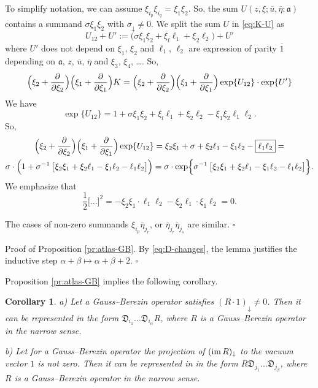 \documentclass[]{amsart}
\newtheorem{corollary}[theorem]{Corollary}
\newcommand{\im}{\mathop{\rm im}\nolimits}
\def\frD{\mathfrak D}
\def\fra{\mathfrak a}
\def\ov{\overline}
\def\sm{\smallskip}
\def\1{{\ov 1}}
\begin{document}
To simplify notation, we can assume $\xi_{i_p}\xi_{i_q}=\xi_1\xi_2$.
So, the sum $U(z,\xi;\ov u, \ov \eta;\fra)$
contains a summand $\sigma \xi_1\xi_2$ with $\sigma_\downarrow\ne 0$.
We split the sum $U$ in \eqref{eq:K-U} as
$$U_{12}+U':=
\bigl( \sigma \xi_1\xi_2+ \xi_l \ell_1 +\xi_2\ell_2\bigr) + U' 
$$
where $U'$ does not depend on $\xi_1$, $\xi_2$ and
$\ell_{1}$, $\ell_{2}$ are expression of parity $\1$ depending
on $\fra$, $z$, $\ov u$, $\ov \eta$ and $\xi_3$, $\xi_4$, \dots.
So,
$$
\Bigl(\xi_2+\frac\partial{\partial \xi_2}\Bigr)
\Bigl(\xi_1+\frac\partial{\partial \xi_1}\Bigr)
K=
\Bigl(\xi_2+\frac\partial{\partial \xi_2}\Bigr)
\Bigl(\xi_1+\frac\partial{\partial \xi_1}\Bigr)\exp\{U_{12}\}
\cdot \exp\{U'\}
$$
We have
$$
\exp\{U_{12}\}=1+\sigma \xi_1\xi_2+ \xi_l \ell_1 +\xi_2\ell_2-\boxed{\xi_1\xi_2\ell_1\ell_2}.
$$
So, 
\begin{multline*}
\Bigl(\xi_2+\frac\partial{\partial \xi_2}\Bigr)
\Bigl(\xi_1+\frac\partial{\partial \xi_1}\Bigr)
\exp\{U_{12}\}=\xi_2\xi_1+\sigma +\xi_2\ell_1-\xi_1\ell_2-\boxed{\ell_1\ell_2}
=\\\sigma\cdot\Bigl(1+\sigma^{-1}\,
\bigl[\xi_2\xi_1+\xi_2\ell_1-\xi_1\ell_2-\ell_1\ell_2 \bigr]\Bigr)=
\sigma\cdot\exp\Bigl\{ \sigma^{-1}\,
\bigl[\xi_2\xi_1+\xi_2\ell_1-\xi_1\ell_2-\ell_1\ell_2 \bigr]\Bigr\}.
\end{multline*}
We emphasize that 
$$
\frac12\bigl[\dots\bigr]^2=
-\xi_2\xi_1\cdot \ell_1\ell_2-\xi_2\ell_1\cdot \xi_1\ell_2=0. 
$$ 

The cases of non-zero summands $\xi_{i_p}\ov\eta_{j_r}$,
or $\ov\eta_{j_r}\ov\eta_{j_s}$
 are similar.
\hfill $\square$

\sm 

{\sc Proof of Proposition \ref{pr:atlas-GB}.}
 By \eqref{eq:D-changes}, the lemma justifies the inductive step $\alpha+\beta\mapsto \alpha+\beta+2$.
\hfill $\square$

\sm

Proposition \ref{pr:atlas-GB} implies the following corollary.

\begin{corollary}
	\label{cor:unit-not-in-kernel}
{\rm a)} Let a Gauss--Berezin operator satisfies $(R\cdot 1)_\downarrow\ne 0$. Then it can be represented in the form
$\frD_{i_1}\dots \frD_{i_\alpha} R$, where $R$ is a Gauss--Berezin operator
in the narrow sense.

\sm



{\rm b)} Let for  
a  Gauss--Berezin operator the projection of $(\im R)_\downarrow$ to the vacuum vector $1$
is not zero.
Then it can be represented in in the form
$R \frD_{j_1}\dots \frD_{j_\beta}$, where
$R$ is a Gauss--Berezin operator in the narrow sense.
\end{corollary}
\end{document}
